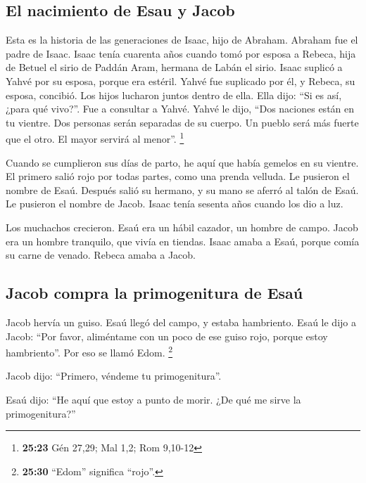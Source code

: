 \hypertarget{el-nacimiento-de-esau-y-jacob}{%
\subsection{El nacimiento de Esau y
Jacob}\label{el-nacimiento-de-esau-y-jacob}}

 Esta es la historia de las generaciones de Isaac, hijo
de Abraham. Abraham fue el padre de Isaac.  Isaac tenía
cuarenta años cuando tomó por esposa a Rebeca, hija de Betuel el sirio
de Paddán Aram, hermana de Labán el sirio.  Isaac suplicó
a Yahvé por su esposa, porque era estéril. Yahvé fue suplicado por él, y
Rebeca, su esposa, concibió.  Los hijos lucharon juntos
dentro de ella. Ella dijo: ``Si es así, ¿para qué vivo?''. Fue a
consultar a Yahvé.  Yahvé le dijo, ``Dos naciones están
en tu vientre. Dos personas serán separadas de su cuerpo. Un pueblo será
más fuerte que el otro. El mayor servirá al menor''. \footnote{\textbf{25:23}
  Gén 27,29; Mal 1,2; Rom 9,10-12}

 Cuando se cumplieron sus días de parto, he aquí que
había gemelos en su vientre.  El primero salió rojo por
todas partes, como una prenda velluda. Le pusieron el nombre de Esaú.
 Después salió su hermano, y su mano se aferró al talón
de Esaú. Le pusieron el nombre de Jacob. Isaac tenía sesenta años cuando
los dio a luz.

 Los muchachos crecieron. Esaú era un hábil cazador, un
hombre de campo. Jacob era un hombre tranquilo, que vivía en tiendas.
 Isaac amaba a Esaú, porque comía su carne de venado.
Rebeca amaba a Jacob.

\hypertarget{jacob-compra-la-primogenitura-de-esauxfa}{%
\subsection{Jacob compra la primogenitura de
Esaú}\label{jacob-compra-la-primogenitura-de-esauxfa}}

 Jacob hervía un guiso. Esaú llegó del campo, y estaba
hambriento.  Esaú le dijo a Jacob: ``Por favor,
aliméntame con un poco de ese guiso rojo, porque estoy hambriento''. Por
eso se llamó Edom. \footnote{\textbf{25:30} ``Edom'' significa ``rojo''.}

 Jacob dijo: ``Primero, véndeme tu primogenitura''.

 Esaú dijo: ``He aquí que estoy a punto de morir. ¿De qué
me sirve la primogenitura?''

